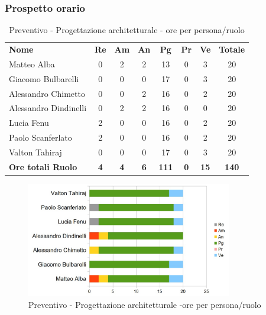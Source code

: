 \subsubsection{Prospetto orario}

\begin{table} [h!]
	\begin{center}
		\begin{tabular} { m{3.5cm} c c c c c c c }
			\rowcolor{lightgray}
			\textbf{Nome} & \textbf{Re} & \textbf{Am} & \textbf{An} & \textbf{Pg} & \textbf{Pr} & \textbf{Ve} & \textbf{Totale} \\
			Matteo Alba & 0 & 2 & 2 & 13 & 0 & 3 & 20 \\
			Giacomo Bulbarelli & 0 & 0 & 0 & 17 & 0 & 3 & 20 \\
			Alessandro Chimetto & 0 & 0 & 2 & 16 & 0 & 2 & 20 \\
			Alessandro Dindinelli & 0 & 2 & 2 & 16 & 0 & 0 & 20 \\
			Lucia Fenu & 2 & 0 & 0 & 16 & 0 & 2 & 20 \\
			Paolo Scanferlato & 2 & 0 & 0 & 16 & 0 & 2 & 20 \\
			Valton Tahiraj & 0 & 0 & 0 & 17 & 0 & 3 & 20 \\
			\textbf{Ore totali Ruolo} & \textbf{4} & \textbf{4} & \textbf{6} & \textbf{111} & \textbf{0}& \textbf{15} & \textbf{140}
		\end{tabular}
		\caption{Preventivo - Progettazione architetturale - ore per persona/ruolo}
	\end{center}
\end{table}

\begin{figure} [h!]
	\centering
	\includegraphics[width=0.8\textwidth]{res/img/grafici/ProgettazioneArchitetturaleOre.jpg}
	\caption{Preventivo - Progettazione architetturale -ore per persona/ruolo} 
\end{figure}

